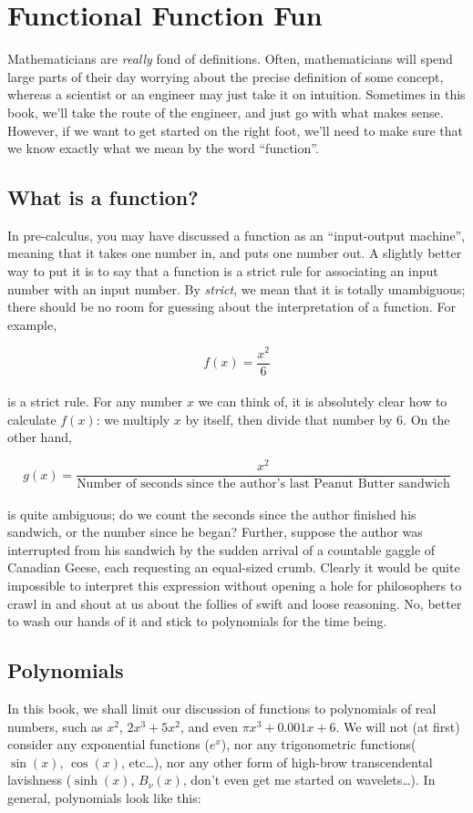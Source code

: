 \chapter{Functional Function Fun}
\label{chap:Functions}

Mathematicians are \emph{really} fond of definitions. Often, mathematicians will spend large parts of their day worrying about the precise definition of some concept, whereas a scientist or an engineer may just take it on intuition. Sometimes in this book, we'll take the route of the engineer, and just go with what makes sense. However, if we want to get started on the right foot, we'll need to make sure that we know exactly what we mean by the word ``function''.

\section{What is a function?}
In pre-calculus, you may have discussed a function as an ``input-output machine'', meaning that it takes one number in, and puts one number out. A slightly better way to put it is to say that a function is a strict rule for associating an input number with an input number. By \emph{strict}, we mean that it is totally unambiguous; there should be no room for guessing about the interpretation of a function. For example,

\[f(x) = \frac{x^2}{6}\]\\

is a strict rule. For any number $x$ we can think of, it is absolutely clear how to calculate $f(x)$: we multiply $x$ by itself, then divide that number by $6$. On the other hand,

\[g(x) = \frac{x^2}{\text{Number of seconds since the author's last Peanut Butter sandwich}}\]\\

is quite ambiguous; do we count the seconds since the author finished his sandwich, or the number since he began? Further, suppose the author was interrupted from his sandwich by the sudden arrival of a countable gaggle of Canadian Geese, each requesting an equal-sized crumb. Clearly it would be quite impossible to interpret this expression without opening a hole for philosophers to crawl in and shout at us about the follies of swift and loose reasoning. No, better to wash our hands of it and stick to polynomials for the time being. 

\section{Polynomials}
In this book, we shall limit our discussion of functions to polynomials of real numbers, such as $x^2$, $2x^3 + 5x^2$, and even $\pi x^3 + 0.001x + 6$. We will not (at first) consider any exponential functions ($e^x$), nor any trigonometric functions($\sin(x)$, $\cos(x)$, etc\ldots), nor any other form of high-brow transcendental lavishness ($\sinh(x)$, $B_\nu(x)$, don't even get me started on wavelets\ldots). In general, polynomials look like this:

